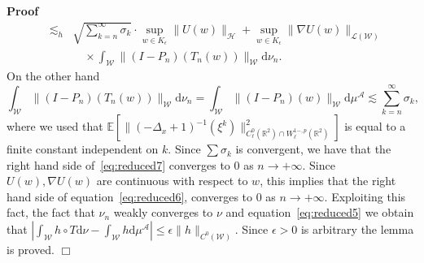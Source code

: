 \documentclass[a4paper,10pt]{article}
\newcommand{\mathd}{\mathrm{d}}
\newenvironment{proof}{\noindent\textbf{Proof\ }}{\hspace*{\fill}$\Box$\medskip}
\begin{document}
\begin{proof}
\begin{eqnarray}
    & \lesssim_h & \sqrt{\sum_{k = n}^{\infty} \sigma_k} \cdot \sup_{w \in
    K_{\epsilon}} \| U (w) \|_{\mathcal{H}} + \sup_{w \in K_{\epsilon}} \|
    \nabla U (w) \|_{\mathcal{L} (\mathcal{W})} \nonumber\\
    &  & \quad \times \int_{\mathcal{W}} \| (I - P_n) (T_n (w))
    \|_{\mathcal{W}} \mathd \nu_n .  \label{eq:reduced6}
  \end{eqnarray}
  On the other hand
  \begin{equation}
    \int_{\mathcal{W}} \| (I - P_n) (T_n (w)) \|_{\mathcal{W}} \mathd \nu_n =
    \int_{\mathcal{W}} \| (I - P_n) (w) \|_{\mathcal{W}} \mathd
    \mu^{\mathcal{A}} \lesssim \sum_{k = n}^{\infty} \sigma_k
    \label{eq:reduced7},
  \end{equation}
  where we used that $\mathbb{E} [\| (- \Delta_x + 1)^{- 1} (\xi^k)
  \|^2_{C^0_{\ell} (\mathbb{R}^2) \cap W^{1 -, p}_{\ell} (\mathbb{R}^2)}]$ is
  equal to a finite constant independent on $k$. Since $\sum \sigma_k$ is
  convergent, we have that the right hand side of~{\eqref{eq:reduced7}}
  converges to 0 as $n \rightarrow + \infty$. Since $U (w), \nabla U (w)$ are
  continuous with respect to $w$, this implies that the right hand side of
  equation~{\eqref{eq:reduced6}}, converges to 0 as $n \rightarrow + \infty$.
  Exploiting this fact, the fact that $\nu_n$ weakly converges to $\nu$ and
  equation~{\eqref{eq:reduced5}} we obtain that $\left| \int_{\mathcal{W}} h
  \circ T \mathd \nu - \int_{\mathcal{W}} h \mathd \mu^{\mathcal{A}} \right|
  \leqslant \epsilon \| h \|_{C^0 (\mathcal{W})}$. Since $\epsilon > 0$ is
  arbitrary the lemma is proved.
\end{proof}
\end{document}
